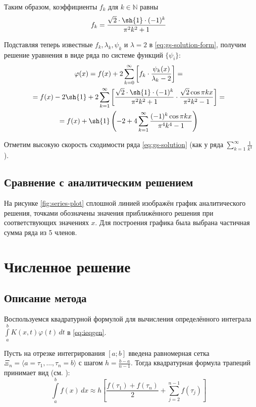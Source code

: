 \documentclass{article}
\numberwithin{equation}{section}
\renewcommand{\phi}{\varphi}
\newcommand{\intl}{\int\limits}
\providecommand{\set}[1]{\mathbb{#1}}
\begin{document}
Таким образом, коэффициенты $f_k$ для $k \in \set{N}$ равны
\begin{equation}
  f_k = \frac{\sqrt{2} \cdot \sh{1}\cdot (-1)^k}{\pi^2 k^2 + 1}
\end{equation}

Подставляя теперь известные $f_k, \lambda_k, \psi_k$ и $\lambda = 2$ в
\eqref{eq:gs-solution-form}, получим решение уравнения в виде ряда по
системе функций $\{\psi_i\}$:
\begin{multline}
  \label{eq:gs-solution}
  \phi(x) = f(x) + 2 \sum_{k=0}^\infty \left [
    f_k\cdot\frac{\psi_k(x)}{\lambda_k-2} \right ] = \\
  = f(x) - 2 \sh{1} + 2 \sum_{k=1}^\infty\left [ \frac{\sqrt{2} \cdot
      \sh{1}\cdot (-1)^k}{\pi^2 k^2 + 1} \cdot \frac{\sqrt{2}\cos{\pi
        k x}}{\pi^2 k^2 - 1} \right ] = \\
  = f(x) + \sh{1} \left ( -2 + 4  \sum_{k=1}^\infty \frac{(-1)^k
      \cos{\pi k x}} {\pi^4 k^4 - 1} \right )
\end{multline}

Отметим высокую скорость сходимости ряда \eqref{eq:gs-solution} (как у
ряда $\sum \limits_{k=1}^\infty \frac{1}{k^4}$).

\subsection{Сравнение с аналитическим решением}

На рисунке \ref{fig:series-plot} сплошной линией изображён график
аналитического решения, точками обозначены значения приближённого
решения при соответствующих значениях $x$. Для построения графика была
выбрана частичная сумма ряда из 5 членов.




\clearpage
\section{Численное решение}
\label{sec:numeric}
\subsection{Описание метода}
Воспользуемся квадратурной формулой для вычисления определённого
интеграла $\intl_a^b {K(x, t) \phi(t)\,dt}$ в \eqref{eq:ieqgen}.

Пусть на отрезке интегрирования $[a; b]$ введена равномерная сетка
$\Xi_n = \langle a = \tau_1, \dotsc, \tau_n = b \rangle$ с шагом
$h = \frac{b-a}{n-1}$. Тогда квадратурная формула трапеций принимает
вид (см. \cite{bakhvalov01}):
\begin{equation}
  \label{eq:trapez-rule}
  \intl_a^b{f(x)\,dx} \approx h \left [ \frac{f(\tau_1)+f(\tau_n)}{2} +
    \sum_{j=2}^{n-1} f(\tau_j) \right ]
\end{equation}
\end{document}
